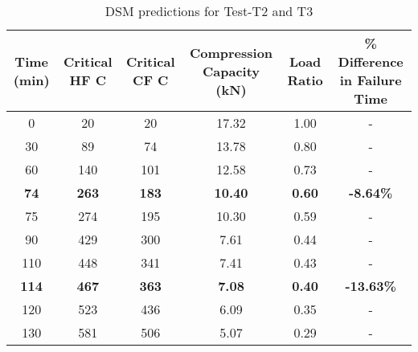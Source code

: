 \begin{table}[htbp]
	\centering
	\caption{DSM predictions for Test-T2 and T3}
	\begin{tabular}{cccccc}
		\toprule
		\multicolumn{1}{p{2.57em}}{Time (min)} & \multicolumn{1}{p{3.215em}}{Critical HF \degree C} & \multicolumn{1}{p{3.215em}}{Critical CF \degree C} & \multicolumn{1}{p{5.93em}}{Compression Capacity (kN)} & \multicolumn{1}{p{2.43em}}{Load Ratio} &
		\multirow{2}{7em}{\% Difference in Failure Time} \\
		\midrule
		0    & 20   & 20   & 17.32 & 1.00 & - \\
		30   & 89   & 74   & 13.78 & 0.80 & - \\
		60   & 140  & 101  & 12.58 & 0.73 & - \\
		\textbf{74}   & \textbf{263}  & \textbf{183}  & \textbf{10.40} & \textbf{0.60} & \textbf{-8.64\%}\\
		75   & 274  & 195  & 10.30 & 0.59 & - \\
		90   & 429  & 300  & 7.61 & 0.44 & - \\
		110  & 448  & 341  & 7.41 & 0.43 & - \\
		\textbf{114}  & \textbf{467}  & \textbf{363}  & \textbf{7.08} & \textbf{0.40} & \textbf{-13.63\%} \\
		120  & 523  & 436  & 6.09 & 0.35 & - \\
		130  & 581  & 506  & 5.07 & 0.29 & - \\
		\bottomrule
	\end{tabular}%
	\label{tab:DSM-T2-T3}%
\end{table}%

